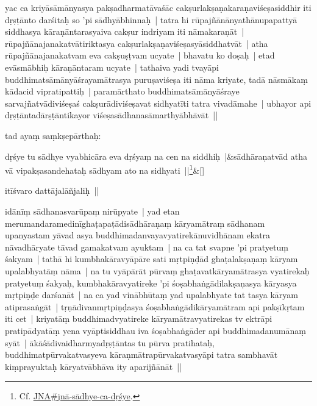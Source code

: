\documentclass[article,12pt,a4paper]{memoir}
\newcommand{\gap}[1]{}
\newcommand{\deletion}[1]{($^{-}$#1)}
\begin{document}
	  
	

	  \pstart yac ca kriyāsāmānyasya pakṣadharmatāvaśāc cakṣurlakṣaṇakaraṇaviśeṣasiddhir iti dṛṣṭānto darśitaḥ so 'pi sādhyābhinnaḥ | tatra hi rūpajñānānyathānupapattyā siddhasya kāraṇāntarasyaiva cakṣur indriyam iti nāmakaraṇāt | rūpajñānajanakatvātiriktasya cakṣurlakṣaṇaviśeṣasyāsiddhatvāt | atha rūpajñānajanakatvam eva cakṣuṣṭvam ucyate | bhavatu ko doṣaḥ | etad evāsmābhiḥ kāraṇāntaram ucyate | tathaiva yadi tvayāpi buddhimatsāmānyāśrayamātrasya puruṣaviśeṣa iti nāma kriyate, tadā nāsmākaṃ kādacid vipratipattiḥ | paramārthato buddhimatsāmānyāśraye sarvajñatvādiviśeṣaś cakṣurādiviśeṣavat sidhyatīti tatra vivadāmahe | ubhayor api dṛṣṭāntadārṣṭāntikayor viśeṣasādhanasāmarthyābhāvāt ||
	\pend
      
	  
	

	  \pstart tad ayaṃ saṃkṣepārthaḥ:
	\pend
      
	    
	    \stanza[\smallbreak]
	dṛśye tu sādhye vyabhicāra eva dṛśyaṃ na cen na siddhiḥ |&sādhāraṇatvād atha vā vipakṣasandehataḥ sādhyam ato na sidhyati ||\footnote{Cf. \href{JNA\#jnā-sādhye-ca-dṛśye}{JNA\#jnā-sādhye-ca-dṛśye}.}\&[\smallbreak]


	

	  \pstart itīśvaro dattājalāñjaliḥ ||
	\pend
      \label{īsd-sādhanasvarūpa}
	  
	

	  \pstart idānīṃ sādhanasvarūpaṃ nirūpyate | yad etan merumandaramedinīghaṭapaṭādisādhāraṇaṃ kāryamātraṃ sādhanam upanyastam yāvad asya buddhimadanvayavyatirekānuvidhānam ekatra nāvadhāryate tāvad gamakatvam ayuktam | na ca tat svapne 'pi pratyetuṃ śakyam | tathā hi kumbhakāravyāpāre sati mṛtpiṇḍād ghaṭalakṣaṇaṃ kāryam upalabhyatāṃ nāma | na tu vyāpārāt pūrvaṃ ghaṭavatkāryamātrasya vyatirekaḥ pratyetuṃ śakyaḥ, kumbhakāravyatireke 'pi śoṣabhaṅgādilakṣaṇasya kāryasya mṛtpiṇḍe darśanāt | na ca yad vinābhūtaṃ yad upalabhyate tat tasya kāryam atiprasaṅgāt | tṛṇādivanmṛtpiṇḍasya śoṣabhaṅgādikāryamātram api pakṣīkṛtam iti cet | kriyatāṃ buddhimadvyatireke kāryamātravyatirekas tv ektrāpi pratipādyatāṃ yena vyāptisiddhau \edtext{tṛṇādir}{\Afootnote{tṛṇādi\deletion{|}\gap{}r \cite{RNAms} ; tṛṇādir \cite{thakur75}   {\rmlatinfont [App type: var]}}} iva śoṣabhaṅgāder api buddhimadanumānaṃ syāt | ākāśādivaidharmyadṛṣṭāntas tu pūrva pratihataḥ, buddhimatpūrvakatvasyeva kāraṇmātrapūrvakatvasyāpi tatra sambhavāt kiṃprayuktaḥ kāryatvābhāva ity aparijñānāt ||
	\pend
      
\end{document}
